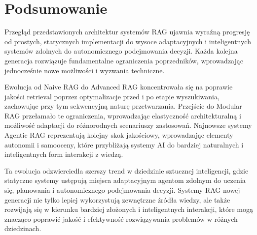 \section*{Podsumowanie}

Przegląd przedstawionych architektur systemów RAG ujawnia wyraźną progresję od prostych, statycznych implementacji do wysoce adaptacyjnych i inteligentnych systemów zdolnych do autonomicznego podejmowania decyzji. 
Każda kolejna generacja rozwiązuje fundamentalne ograniczenia poprzedników, wprowadzając jednocześnie nowe możliwości i wyzwania techniczne.

Ewolucja od Naive RAG do Advanced RAG koncentrowała się na poprawie jakości retrieval poprzez optymalizacje przed i po etapie wyszukiwania, zachowując przy tym sekwencyjną naturę przetwarzania. 
Przejście do Modular RAG przełamało te ograniczenia, wprowadzając elastyczność architekturalną i możliwość adaptacji do różnorodnych scenariuszy zastosowań. 
Najnowsze systemy Agentic RAG reprezentują kolejny skok jakościowy, wprowadzając elementy autonomii i samooceny, które przybliżają systemy AI do bardziej naturalnych i inteligentnych form interakcji z wiedzą.

Ta ewolucja odzwierciedla szerszy trend w dziedzinie sztucznej inteligencji, gdzie statyczne systemy ustępują miejsca adaptacyjnym agentom zdolnym do uczenia się, planowania i autonomicznego podejmowania decyzji. 
Systemy RAG nowej generacji nie tylko lepiej wykorzystują zewnętrzne źródła wiedzy, ale także rozwijają się w kierunku bardziej złożonych i inteligentnych interakcji, które mogą znacząco poprawić jakość i efektywność rozwiązywania problemów w różnych dziedzinach.